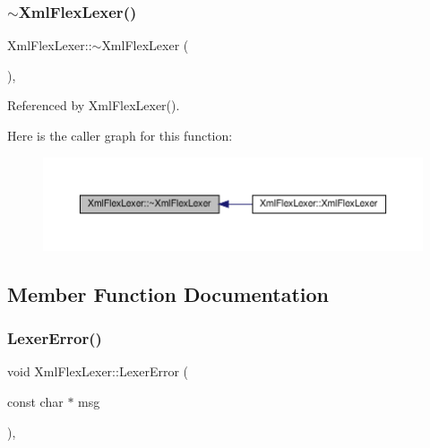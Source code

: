 \subsubsection{\texorpdfstring{$\sim$\+Xml\+Flex\+Lexer()}{~XmlFlexLexer()}}
{\footnotesize\ttfamily Xml\+Flex\+Lexer\+::$\sim$\+Xml\+Flex\+Lexer (\begin{DoxyParamCaption}{ }\end{DoxyParamCaption})\hspace{0.3cm}{\ttfamily [override]}, {\ttfamily [default]}}



Referenced by Xml\+Flex\+Lexer().

Here is the caller graph for this function\+:
\nopagebreak
\begin{figure}[H]
\begin{center}
\leavevmode
\includegraphics[width=350pt]{d4/d3d/structXmlFlexLexer_ad0d2dd2e6a90c700b6769a31d624210b_icgraph}
\end{center}
\end{figure}


\subsection{Member Function Documentation}
\mbox{\label{structXmlFlexLexer_a06098f140d995d7130576a4f60790999}} 
\subsubsection{\texorpdfstring{Lexer\+Error()}{LexerError()}}
{\footnotesize\ttfamily void Xml\+Flex\+Lexer\+::\+Lexer\+Error (\begin{DoxyParamCaption}\item[{const char $\ast$}]{msg }\end{DoxyParamCaption})\hspace{0.3cm}{\ttfamily [inline]}, {\ttfamily [override]}}



